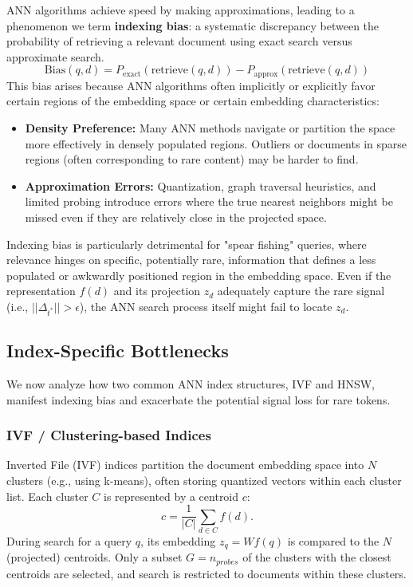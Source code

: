 \documentclass[manuscript]{acmart}
\begin{document}
ANN algorithms achieve speed by making approximations, leading to a phenomenon we term \textbf{indexing bias}: a systematic discrepancy between the probability of retrieving a relevant document using exact search versus approximate search.
\begin{equation}
\text{Bias}(q, d) = P_{\text{exact}}(\text{retrieve}(q, d)) - P_{\text{approx}}(\text{retrieve}(q, d)) \label{eq:indexing_bias}
\end{equation}
This bias arises because ANN algorithms often implicitly or explicitly favor certain regions of the embedding space or certain embedding characteristics:
\begin{itemize}
    \item \textbf{Density Preference:} Many ANN methods navigate or partition the space more effectively in densely populated regions. Outliers or documents in sparse regions (often corresponding to rare content) may be harder to find.
    \item \textbf{Approximation Errors:} Quantization, graph traversal heuristics, and limited probing introduce errors where the true nearest neighbors might be missed even if they are relatively close in the projected space.
\end{itemize}
Indexing bias is particularly detrimental for "spear fishing" queries, where relevance hinges on specific, potentially rare, information that defines a less populated or awkwardly positioned region in the embedding space. Even if the representation $f(d)$ and its projection $z_d$ adequately capture the rare signal (i.e., $||\Delta_{t^*}|| > \epsilon$), the ANN search process itself might fail to locate $z_d$.

\subsection{Index-Specific Bottlenecks} %

We now analyze how two common ANN index structures, IVF and HNSW, manifest indexing bias and exacerbate the potential signal loss for rare tokens.

\subsubsection{IVF / Clustering-based Indices} %

Inverted File (IVF) indices partition the document embedding space into $N$ clusters (e.g., using k-means), often storing quantized vectors within each cluster list. Each cluster $C$ is represented by a centroid $c$:
\begin{equation}
c = \frac{1}{|C|}\sum_{d\in C} f(d). \label{eq:centroid_calc}
\end{equation}
During search for a query $q$, its embedding $z_q = Wf(q)$ is compared to the $N$ (projected) centroids. Only a subset $G = n_{probes}$ of the clusters with the closest centroids are selected, and search is restricted to documents within these clusters.
\end{document}
